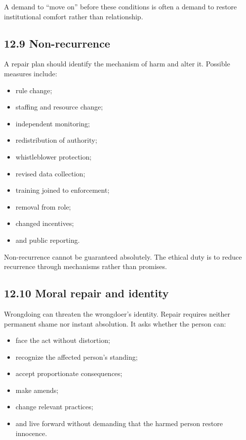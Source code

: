 \documentclass[
  11pt,
]{article}
\providecommand{\tightlist}{%
  \setlength{\itemsep}{0pt}\setlength{\parskip}{0pt}}
\begin{document}
A demand to ``move on'' before these conditions is often a demand to
restore institutional comfort rather than relationship.

\subsection{12.9 Non-recurrence}\label{non-recurrence}

A repair plan should identify the mechanism of harm and alter it.
Possible measures include:

\begin{itemize}
\tightlist
\item
  rule change;
\item
  staffing and resource change;
\item
  independent monitoring;
\item
  redistribution of authority;
\item
  whistleblower protection;
\item
  revised data collection;
\item
  training joined to enforcement;
\item
  removal from role;
\item
  changed incentives;
\item
  and public reporting.
\end{itemize}

Non-recurrence cannot be guaranteed absolutely. The ethical duty is to
reduce recurrence through mechanisms rather than promises.

\subsection{12.10 Moral repair and
identity}\label{moral-repair-and-identity}

Wrongdoing can threaten the wrongdoer's identity. Repair requires
neither permanent shame nor instant absolution. It asks whether the
person can:

\begin{itemize}
\tightlist
\item
  face the act without distortion;
\item
  recognize the affected person's standing;
\item
  accept proportionate consequences;
\item
  make amends;
\item
  change relevant practices;
\item
  and live forward without demanding that the harmed person restore
  innocence.
\end{itemize}
\end{document}
